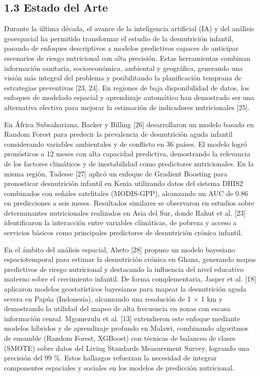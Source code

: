 \documentclass[
]{report}
\begin{document}
\hypertarget{estado-del-arte}{%
\subsection{1.3 Estado del Arte}\label{estado-del-arte}}

Durante la última década, el avance de la inteligencia artificial (IA) y
del análisis geoespacial ha permitido transformar el estudio de la
desnutrición infantil, pasando de enfoques descriptivos a modelos
predictivos capaces de anticipar escenarios de riesgo nutricional con
alta precisión. Estas herramientas combinan información sanitaria,
socioeconómica, ambiental y geográfica, generando una visión más
integral del problema y posibilitando la planificación temprana de
estrategias preventivas {[}23, 24{]}. En regiones de baja
disponibilidad de datos, los enfoques de modelado espacial y aprendizaje
automático han demostrado ser una alternativa efectiva para mejorar la
estimación de indicadores nutricionales {[}25{]}.

En África Subsahariana, Backer y Billing {[}26{]} desarrollaron un
modelo basado en Random Forest para predecir la prevalencia de
desnutrición aguda infantil considerando variables ambientales y de
conflicto en 36 países. El modelo logró pronósticos a 12 meses con alta
capacidad predictiva, demostrando la relevancia de los factores
climáticos y de inestabilidad como predictores nutricionales. En la
misma región, Tadesse {[}27{]} aplicó un enfoque de Gradient Boosting
para pronosticar desnutrición infantil en Kenia utilizando datos del
sistema DHIS2 combinados con señales satelitales (MODIS-GPP), alcanzando
un AUC de 0.86 en predicciones a seis meses. Resultados similares se
observaron en estudios sobre determinantes nutricionales realizados en
Asia del Sur, donde Rahut et al. {[}23{]} identificaron la interacción
entre variables climáticas, de pobreza y acceso a servicios básicos como
principales predictores de desnutrición crónica infantil.

En el ámbito del análisis espacial, Aheto {[}28{]} propuso un modelo
bayesiano espaciotemporal para estimar la desnutrición crónica en Ghana,
generando mapas predictivos de riesgo nutricional y destacando la
influencia del nivel educativo materno sobre el crecimiento infantil. De
forma complementaria, Jasper et al. {[}18{]} aplicaron modelos
geostatísticos bayesianos para mapear la desnutrición aguda severa en
Papúa (Indonesia), alcanzando una resolución de 1 × 1 km y demostrando
la utilidad del mapeo de alta frecuencia en zonas con escasa información
censal. Mgomezulu et al. {[}13{]} extendieron este enfoque mediante
modelos híbridos y de aprendizaje profundo en Malawi, combinando
algoritmos de ensamble (Random Forest, XGBoost) con técnicas de balanceo
de clases (SMOTE) sobre datos del Living Standards Measurement Survey,
logrando una precisión del 99 \%. Estos hallazgos refuerzan la necesidad
de integrar componentes espaciales y sociales en los modelos de
predicción nutricional.
\end{document}
